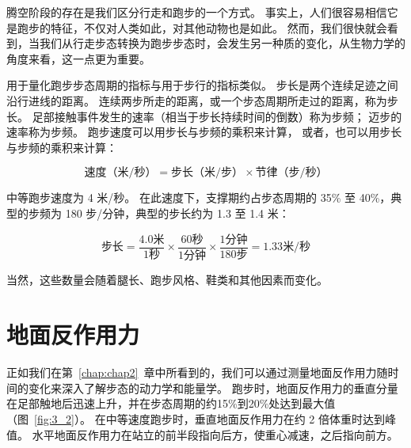 腾空阶段的存在是我们区分行走和跑步的一个方式。
事实上，人们很容易相信它是跑步的特征，不仅对人类如此，对其他动物也是如此。
然而，我们很快就会看到，当我们从行走步态转换为跑步步态时，会发生另一种质的变化，从生物力学的角度来看，这一点更为重要。


用于量化跑步步态周期的指标与用于步行的指标类似。
步长是两个连续足迹之间沿行进线的距离。
连续两步所走的距离，或一个步态周期所走过的距离，称为步长。
足部接触事件发生的速率（相当于步长持续时间的倒数）称为步频；
迈步的速率称为步频。
跑步速度可以用步长与步频的乘积来计算，
或者，也可以用步长与步频的乘积来计算：

\begin{equation}
	\text{速度（米/秒）} = \text{步长（米/步）} \times \text{节律（步/秒）} \label{eq:3_1}
\end{equation}

中等跑步速度为 4 米/秒。
在此速度下，支撑期约占步态周期的 35\% 至 40\%，典型的步频为 180 步/分钟，典型的步长约为 1.3 至 1.4 米：

\begin{equation}
	\text{步长} = \frac{4.0 \text{米}}{1 \text{秒}}
				 \times \frac{60 \text{秒}}{1 \text{分钟}}
				 \times \frac{1 \text{分钟}}{180 \text{步}}
				 = 1.33 \text{米/秒}
				 \label{eq:3_2}
\end{equation}

当然，这些数量会随着腿长、跑步风格、鞋类和其他因素而变化。


\section{地面反作用力}

正如我们在第~\ref{chap:chap2}~章中所看到的，我们可以通过测量地面反作用力随时间的变化来深入了解步态的动力学和能量学。
跑步时，地面反作用力的垂直分量在足部触地后迅速上升，并在步态周期的约15\%到20\%处达到最大值（图~\ref{fig:3_2}）。
在中等速度跑步时，垂直地面反作用力在约 2 倍体重时达到峰值。
水平地面反作用力在站立的前半段指向后方，使重心减速，之后指向前方。

